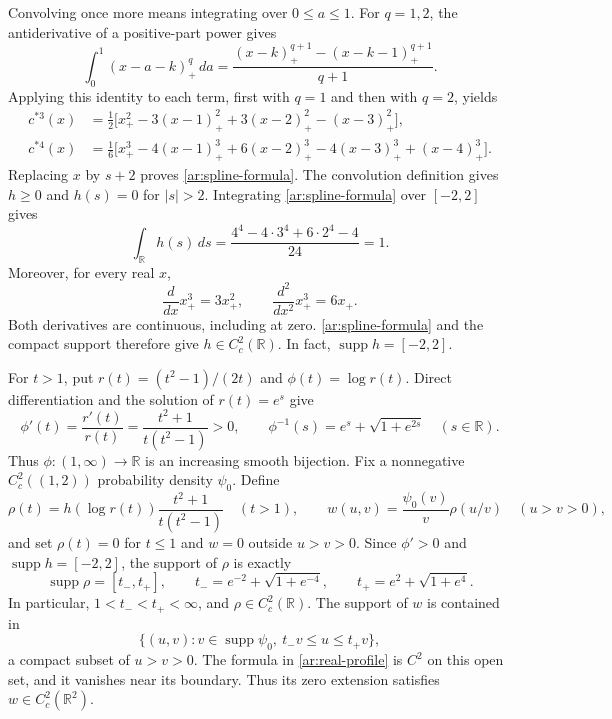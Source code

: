 \documentclass[twoside]{aomart}
\theoremstyle{paperplain}
\theoremstyle{paperdefinition}
\newcommand{\R}{\mathbb R}
\numberwithin{equation}{section}
\begin{document}
Convolving once more means integrating over $0\le a\le1$.
For $q=1,2$, the antiderivative of a positive-part power gives
\begin{equation*}
 \int_0^1(x-a-k)_+^q\,da
 =\frac{(x-k)_+^{q+1}-(x-k-1)_+^{q+1}}{q+1}.
\end{equation*}
Applying this identity to each term, first with $q=1$ and
then with $q=2$, yields
\begin{equation*}
 \begin{aligned}
 c^{*3}(x)
 &=\frac12\bigl[x_+^2-3(x-1)_+^2
                   +3(x-2)_+^2-(x-3)_+^2\bigr],\\
 c^{*4}(x)
 &=\frac16\bigl[x_+^3-4(x-1)_+^3+6(x-2)_+^3
                   -4(x-3)_+^3+(x-4)_+^3\bigr].
 \end{aligned}
\end{equation*}
Replacing $x$ by $s+2$ proves \eqref{ar:spline-formula}.
The convolution definition gives $h\ge0$ and $h(s)=0$ for $|s|>2$.
Integrating \eqref{ar:spline-formula} over $[-2,2]$ gives
\begin{equation*}
 \int_\R h(s)\,ds
 =\frac{4^4-4\cdot3^4+6\cdot2^4-4}{24}=1.
\end{equation*}
Moreover, for every real $x$,
\begin{equation*}
 \frac{d}{dx}x_+^3=3x_+^2,\qquad
 \frac{d^2}{dx^2}x_+^3=6x_+.
\end{equation*}
Both derivatives are continuous, including at zero. \eqref{ar:spline-formula} and the compact support therefore
give $h\in C_c^2(\R)$.
In fact, $\operatorname{supp}h=[-2,2]$.

For $t>1$, put $r(t)=(t^2-1)/(2t)$ and
$\phi(t)=\log r(t)$. Direct differentiation and the solution
of $r(t)=e^s$ give
\begin{equation*}
 \phi'(t)=\frac{r'(t)}{r(t)}
         =\frac{t^2+1}{t(t^2-1)}>0,\qquad
 \phi^{-1}(s)=e^s+\sqrt{1+e^{2s}}\quad(s\in\R).
\end{equation*}
Thus $\phi:(1,\infty)\to\R$ is an increasing smooth bijection.
Fix a nonnegative $C_c^2((1,2))$ probability density $\psi_0$.
Define
\begin{equation}
 \rho(t)=h(\log r(t))\frac{t^2+1}{t(t^2-1)}\quad(t>1),\qquad
 w(u,v)=\frac{\psi_0(v)}v\rho(u/v)\quad(u>v>0),
 \label{ar:real-profile}
\end{equation}
and set $\rho(t)=0$ for $t\le1$ and $w=0$ outside $u>v>0$.
Since $\phi'>0$ and $\operatorname{supp}h=[-2,2]$, the support
of $\rho$ is exactly
\begin{equation*}
 \operatorname{supp}\rho=[t_-,t_+],\qquad
 t_-=e^{-2}+\sqrt{1+e^{-4}},\qquad
 t_+=e^2+\sqrt{1+e^4}.
\end{equation*}
In particular, $1<t_-<t_+<\infty$, and
$\rho\in C_c^2(\R)$. The support of $w$ is contained in
\begin{equation*}
 \{(u,v):v\in\operatorname{supp}\psi_0,
                   \ t_-v\le u\le t_+v\},
\end{equation*}
a compact subset of $u>v>0$. The formula in
\eqref{ar:real-profile} is $C^2$ on this open set, and it
vanishes near its boundary. Thus its zero extension satisfies
$w\in C_c^2(\R^2)$.
\end{document}
